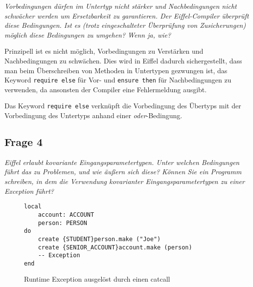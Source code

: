\documentclass[a4paper,10pt]{article}
\begin{document}
\emph{Vorbedingungen dürfen im Untertyp nicht stärker und Nachbedingungen nicht 
schwächer werden um Ersetzbarkeit zu garantieren. Der Eiffel-Compiler überprüft 
diese Bedingungen. Ist es (trotz eingeschalteter Überprüfung von Zusicherungen) 
möglich diese Bedingungen zu umgehen? Wenn ja, wie?}

\vspace{3mm}


Prinzipell ist es nicht möglich, Vorbedingungen zu Verstärken und Nachbedingungen zu schwächen. Dies wird in Eiffel dadurch sichergestellt, dass man beim Überschreiben von Methoden in Untertypen gezwungen ist, das Keyword \verb+require else+ für Vor- und \verb+ensure then+ für Nachbedingungen zu verwenden, da ansonsten der Compiler eine Fehlermeldung ausgibt.

Das Keyword \verb+require else+ verknüpft die Vorbedingung des Übertyps mit der Vorbedingung des Untertyps anhand einer \textit{oder}-Bedingung.


\subsection{Frage 4}

\emph{Eiffel erlaubt kovariante Eingangsparametertypen. Unter welchen Bedingungen 
führt das zu Problemen, und wie äußern sich diese? Können Sie ein Programm 
schreiben, in dem die Verwendung kovarianter Eingangsparametertypen zu einer 
Exception führt?}

\vspace{3mm}


\begin{comment}
See http://docs.eiffel.com/book/method/et-inheritance#Covariance.2C_anchored_declarations.2C_and_.22catcalls.22
\end{comment}

\begin{figure}
\begin{lstlisting}
local
    account: ACCOUNT
    person: PERSON
do
    create {STUDENT}person.make ("Joe")
    create {SENIOR_ACCOUNT}account.make (person)
    -- Exception
end
\end{lstlisting}
\caption{Runtime Exception ausgel\"ost durch einen catcall}
\end{figure}

\vspace{3mm}
\end{document}
